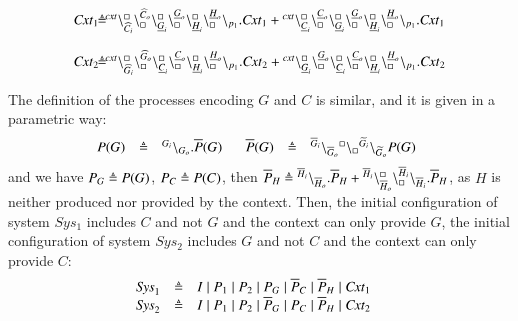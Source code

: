 \[
\begin{array}{l@{\hspace{-0.03cm}}c@{\hspace{-0.03cm}}l}
\mathit{Cxt}_1 & \defeq &\startchain{\mathit{cxt}}\chainedlink{\widehat{C}_i}{\noact}\chainedlink{\noact}{\widehat{C}_o}\chainedlink{\underline{G}_i}{\noact}\chainedlink{\noact}{\underline{G}_o}
\chainedlink{\underline{H}_i}{\noact}\chainedlink{\noact}{\underline{H}_o}\chainend{p_1}.\mathit{Cxt}_1 			                      +
                              \startchain{\mathit{cxt}}\chainedlink{\underline{C}_i}{\noact}\chainedlink{\noact}{\underline{C}_o}\chainedlink{\underline{G}_i}{\noact}\chainedlink{\noact}{\underline{G}_o}\chainedlink{\underline{H}_i}{\noact}\chainedlink{\noact}{\underline{H}_o}\chainend{p_1}.\mathit{Cxt}_1 \\
                              \\
                              \mathit{Cxt}_2 & \defeq &\startchain{\mathit{cxt}}\chainedlink{\widehat{G}_i}{\noact}\chainedlink{\noact}{\widehat{G}_o}\chainedlink{\underline{C}_i}{\noact}\chainedlink{\noact}{\underline{C}_o}\chainedlink{\underline{H}_i}{\noact}\chainedlink{\noact}{\underline{H}_o}\chainend{p_1}.\mathit{Cxt}_2 	                      +
                              \startchain{\mathit{cxt}}\chainedlink{\underline{G}_i}{\noact}\chainedlink{\noact}{\underline{G}_o}\chainedlink{\underline{C}_i}{\noact}\chainedlink{\noact}{\underline{C}_o}\chainedlink{\underline{H}_i}{\noact}\chainedlink{\noact}{\underline{H}_o}\chainend{p_1}.\mathit{Cxt}_2
\end{array}
\]

The definition of the processes encoding $G$ and $C$ is similar, and it is given in a parametric way:
\[
\begin{array}{lcl @{\hspace{0.5cm}}lcl}
P(G) &\defeq&\link{G_i}{G_o}.\overline{P}(G)\   & \overline{P}(G)&\defeq&\link{\overline{G}_i}{\overline{G}_o} \link{\noact}{\noact}\link{\widetilde{G}_i}{\widetilde{G}_o}P(G) \ \ 			                      
\end{array}
\]
and we have $P_G \triangleq P(G)$, $P_C \triangleq P(C)$,  then $\overline{P}_H \triangleq {}^{\overline{H}_i} \backslash_{\overline{H}_o}.\overline{P}_H + {}^{\overline{H}_i}\backslash_{\overline{H}_o}^{\scriptstyle {\square}}\backslash_{\scriptstyle {\square}}^{\overline{H}_i}\backslash_{\overline{H}_i}.\overline{P}_H$, as $H$ is neither produced nor provided by the context.
Then, the initial configuration of system $Sys_1$ includes $C$ and not $G$ and the context can only provide $G$,
the initial configuration of system $Sys_2$ includes $G$ and not $C$ and the context can only provide $C$:
\[
\begin{array}{lcl@{\hspace{0.5cm}}lcl}
\mathit{Sys}_1 & \defeq & I\mid  P_1 \mid P_2 \mid P_G \mid \overline{P}_C \mid \overline{P}_H\mid \mathit{Cxt}_1 \\
\mathit{Sys}_2 & \defeq & I \mid P_1 \mid P_2 \mid \overline{P}_G \mid P_C \mid \overline{P}_H\mid \mathit{Cxt}_2\\
\end{array}
\]



